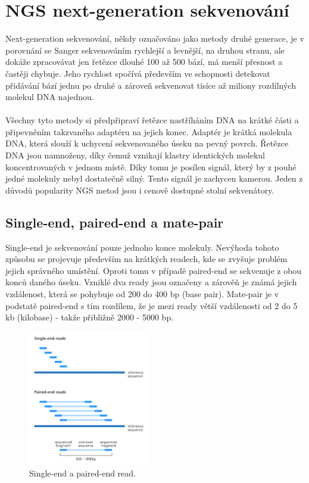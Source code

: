 \documentclass[czech,DP]{thesiskiv}
\numberwithin{equation}{section}
\begin{document}
\section{NGS next-generation sekvenování}
Next-generation sekvenování, někdy označováno jako metody druhé generace, je v porovnání se Sanger sekvenováním rychlejší a levnější, na druhou stranu, ale dokáže zpracovávat jen řetězce dlouhé 100 až 500 bází, má menší přesnost a častěji chybuje. Jeho rychlost spočívá především ve schopnosti detekovat přidávání bází jednu po druhé a zároveň sekvenovat tisíce až miliony rozdílných molekul DNA najednou. 
\\
\\
Všechny tyto metody si předpřipraví řetězce nastříháním DNA na krátké části a připevněním takzvaného adaptéru na jejich konec. Adaptér je krátká molekula DNA, která slouží k uchycení sekvenovaného úseku na pevný povrch. Řetězce DNA jsou namnoženy, díky čemuž vznikají klastry identických molekul koncentrovaných v jednom místě. Díky tomu je posílen signál, který by z pouhé jedné molekuly nebyl dostatečně silný. Tento signál je zachycen kamerou. Jeden z důvodů popularity NGS metod jsou i cenově dostupné stolní sekvenátory.
 
\subsection{Single-end, paired-end a mate-pair}
Single-end je sekvenování pouze jednoho konce molekuly. Nevýhoda tohoto způsobu se projevuje především na krátkých readech, kde se zvyšuje problém jejich správného umístění. Oproti tomu v případě paired-end se sekvenuje z obou konců daného úseku. Vzniklé dva ready jsou označeny a zárověň je známá jejich vzdálenost, která se pohybuje od 200 do 400 bp (base pair). Mate-pair je v podstatě paired-end s tím rozdílem, že je mezi ready větší vzdálenosti od 2 do 5 kb (kilobase) - takže přibližně 2000 - 5000 bp. \cite{illumina}  

\begin{figure}[H]		
		\centering
		\includegraphics[width=200px]{./img/single_end_pair_end_reads_yourgenome.png}
		\caption{Single-end a paired-end read. \cite{your_genome} }
		\label{fig:single_end_paired_end}
\end{figure} 
 
\end{document}
